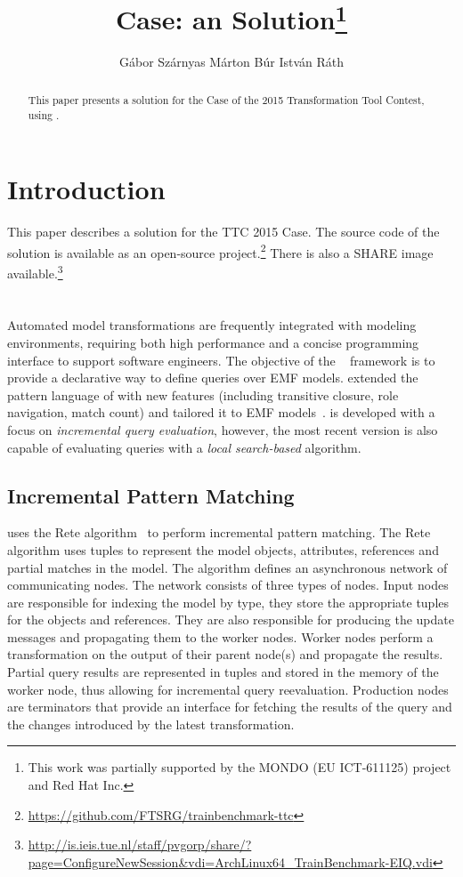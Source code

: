 \documentclass[submission,copyright,creativecommons]{eptcs}
\title{\tb Case: an \eiq Solution\thanks{This work was partially supported by the MONDO (EU ICT-611125) project and Red Hat Inc.}}
\author{G\'{a}bor Sz\'{a}rnyas \qquad M\'{a}rton B\'{u}r \qquad Istv\'{a}n R\'{a}th
\institute{Budapest University of Technology and Economics\\
Department of Measurement and Information Systems\\
H-1117 Magyar tud\'{o}sok krt. 2, Budapest, Hungary}
\email{szarnyas@mit.bme.hu, marton.bur@inf.mit.bme.hu, rath@mit.bme.hu}
}
\begin{document}
\maketitle

\begin{abstract}
This paper presents a solution for the \tb Case of the 2015 Transformation Tool Contest, using \eiq.
\end{abstract}

\section{Introduction}

This paper describes a solution for the TTC 2015 \tb Case. The source code of the solution is available as an open-source project.\footnote{\url{https://github.com/FTSRG/trainbenchmark-ttc}} There is also a SHARE image available.\footnote{\url{http://is.ieis.tue.nl/staff/pvgorp/share/?page=ConfigureNewSession&vdi=ArchLinux64_TrainBenchmark-EIQ.vdi}}

\section{\eiq}

Automated model transformations are frequently integrated with modeling environments, requiring both high performance and a concise programming interface to support software engineers. The objective of the \eiq~\cite{models2010, eiq-homepage} framework is to provide a declarative way to define queries over EMF models. \eiq extended the pattern language of \viatratwo with new features (including transitive closure, role navigation, match count) and tailored it to EMF models~\cite{iqpl}. \eiq is developed with a focus on \emph{incremental query evaluation}, however, the most recent version is also capable of evaluating queries with a \emph{local search-based} algorithm.

\subsection{Incremental Pattern Matching}

\eiq uses the Rete algorithm~\cite{BergmannPhD} to perform incremental pattern matching. The Rete algorithm uses tuples to represent the model objects, attributes, references and partial matches in the model. The algorithm defines an asynchronous network of communicating nodes. The network consists of three types of nodes. Input nodes are responsible for indexing the model by type, \ie they store the appropriate tuples for the objects and references. They are also responsible for producing the update messages and propagating them to the worker nodes. Worker nodes perform a transformation on the output of their parent node(s) and propagate the results. Partial query results are represented in tuples and stored in the memory of the worker node, thus allowing for incremental query reevaluation. Production nodes are terminators that provide an interface for fetching the results of the query and the changes introduced by the latest transformation.
\end{document}
